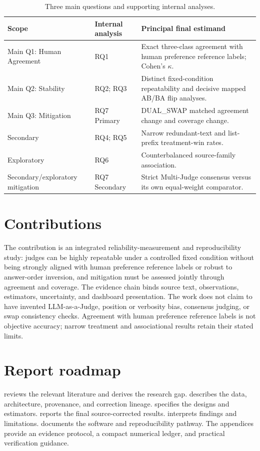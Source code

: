 \begin{table}[H]
\centering
\caption{Three main questions and supporting internal analyses.}
\label{tab:rq-overview}
\begin{tabularx}{\textwidth}{@{}p{}p{}X@{}}
\toprule
Scope & Internal analysis & Principal final estimand \\
\midrule
Main Q1: Human Agreement & RQ1 & Exact three-class agreement with human preference reference labels; Cohen's $\kappa$.\\
Main Q2: Stability & RQ2; RQ3 & Distinct fixed-condition repeatability and decisive mapped AB/BA flip analyses.\\
Main Q3: Mitigation & RQ7 Primary & DUAL\_SWAP matched agreement change and coverage change.\\
Secondary & RQ4; RQ5 & Narrow redundant-text and list-prefix treatment-win rates.\\
Exploratory & RQ6 & Counterbalanced source-family association.\\
Secondary/exploratory mitigation & RQ7 Secondary & Strict Multi-Judge consensus versus its own equal-weight comparator.\\
\bottomrule
\end{tabularx}
\end{table}

\section{Contributions}

The contribution is an integrated reliability-measurement and reproducibility study: judges can be highly repeatable under a controlled fixed condition without being strongly aligned with human preference reference labels or robust to answer-order inversion, and mitigation must be assessed jointly through agreement and coverage. The evidence chain binds source text, observations, estimators, uncertainty, and dashboard presentation. The work does not claim to have invented LLM-as-a-Judge, position or verbosity bias, consensus judging, or swap consistency checks. Agreement with human preference reference labels is not objective accuracy; narrow treatment and associational results retain their stated limits.

\section{Report roadmap}

 reviews the relevant literature and derives the research gap.  describes the data, architecture, provenance, and correction lineage.  specifies the designs and estimators.  reports the final source-corrected results.  interprets findings and limitations.  documents the software and reproducibility pathway. The appendices provide an evidence protocol, a compact numerical ledger, and practical verification guidance.
